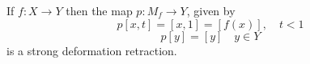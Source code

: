 If $f: X \rightarrow Y$ then the map $p: M_f \rightarrow Y$, given by
$$p[x,t] = [x,1] = [f(x)], \quad t < 1$$
$$p[y] = [y] \quad y \in Y$$
is a strong deformation retraction.

